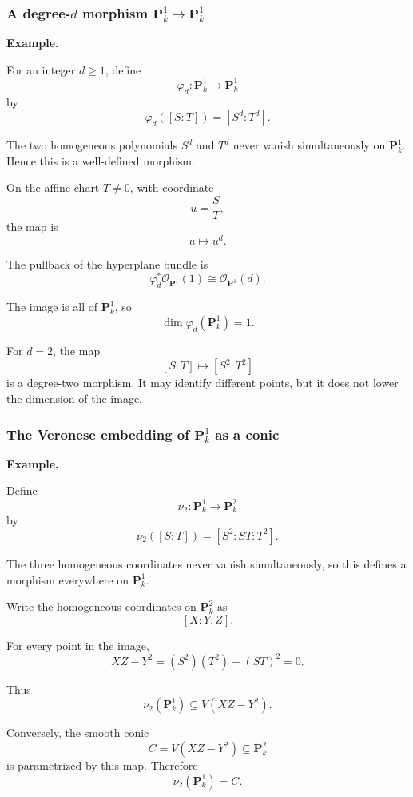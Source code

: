 \documentclass[12pt,a4paper]{article}
\theoremstyle{notespace}
\begin{document}
\subsubsection{\texorpdfstring{A degree-\(d\) morphism \(\mathbf P^1_k\to\mathbf P^1_k\)}{A degree d morphism P1 to P1}}

\textbf{Example.}

For an integer \(d\geq1\), define
\[
\varphi_d:\mathbf P^1_k\longrightarrow\mathbf P^1_k
\]
by
\[
\varphi_d([S:T])
=
[S^d:T^d].
\]

The two homogeneous polynomials \(S^d\) and \(T^d\) never vanish simultaneously on \(\mathbf P^1_k\). Hence this is a well-defined morphism.

On the affine chart \(T\neq0\), with coordinate
\[
u=\frac ST,
\]
the map is
\[
u\longmapsto u^d.
\]

The pullback of the hyperplane bundle is
\[
\varphi_d^*\mathcal O_{\mathbf P^1}(1)
\cong
\mathcal O_{\mathbf P^1}(d).
\]

The image is all of \(\mathbf P^1_k\), so
\[
\dim\varphi_d(\mathbf P^1_k)=1.
\]

For \(d=2\), the map
\[
[S:T]\longmapsto[S^2:T^2]
\]
is a degree-two morphism. It may identify different points, but it does not lower the dimension of the image.

\subsubsection{The Veronese embedding of \(\mathbf P^1_k\) as a conic}

\textbf{Example.}

Define
\[
\nu_2:\mathbf P^1_k\longrightarrow\mathbf P^2_k
\]
by
\[
\nu_2([S:T])
=
[S^2:ST:T^2].
\]

The three homogeneous coordinates never vanish simultaneously, so this defines a morphism everywhere on \(\mathbf P^1_k\).

Write the homogeneous coordinates on \(\mathbf P^2_k\) as
\[
[X:Y:Z].
\]

For every point in the image,
\[
XZ-Y^2
=
(S^2)(T^2)-(ST)^2
=
0.
\]

Thus
\[
\nu_2(\mathbf P^1_k)
\subseteq
V(XZ-Y^2).
\]

Conversely, the smooth conic
\[
C=V(XZ-Y^2)\subseteq\mathbf P^2_k
\]
is parametrized by this map. Therefore
\[
\nu_2(\mathbf P^1_k)=C.
\]
\end{document}
